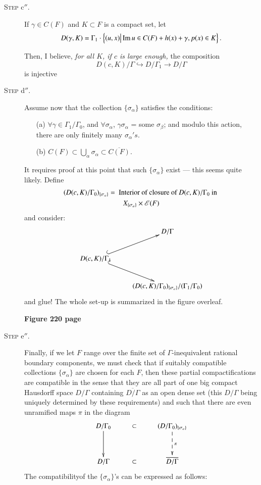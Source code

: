 \begin{description}
\item[\textsc{Step} c$''$.] If $\gamma \in C(F)$ and $K \subset F$ is a compact set, let
$$
D (\gamma, K) = \Gamma_1 \cdot \left\{ (u, x) \big| \operatorname{Im}  u \in C (F) + h(x) + \gamma, p(x) \in K\right\}.
$$

Then, I believe, \textit{ for all $K$, if $c$ is large enough, } the composition
$$
D(c,K) / \Gamma \hookrightarrow D / \Gamma_1 \to D / \Gamma
$$ 
is injective

\item[\textsc{Step} d$''$.] Assume now that the collection $\{\sigma_\alpha\}$ satisfies the conditions:
\begin{itemize}
\item[(a)] $\forall \gamma \in \Gamma_1 / \Gamma_0$, and $\forall \sigma_\alpha$, $\gamma \sigma_\alpha$ = some $\sigma_\beta$; and modulo this action, there are only finitely many $\sigma_\alpha's$.

\item[(b)] $C(F) \subset \bigcup\limits_\alpha \sigma_\alpha \subset \overline{C(F)}$.
\end{itemize}

It requires proof at this point that such $\{\sigma_\alpha\}$ exist --- this seems quite likely. Define
\begin{gather*}
(D(c, K)/\Gamma_0)_{\{\sigma_\alpha\}} = \text{ Interior of closure of } D (c, K)/ \Gamma_0 \text{ in }\\
X_{\{\sigma_\alpha\}} \times \mathscr{E} (F)
\end{gather*}
and consider:
$$
\xymatrix{
& D/\Gamma\\
D(c, K)/\Gamma_1 \ar@{^{(}->}[ur] \ar@{^{(}->}[dr] & \\
& (D(c,K)/\Gamma_0)_{\{\sigma_\alpha\}} / (\Gamma_1/ \Gamma_0)
}
$$
and glue! The whole set-up is summarized in the figure overleaf.
\begin{center}
{\bf Figure 220 page}
\end{center}

\pageoriginale
\item[\textsc{Step} e$''$.] Finally, if we let $F$ range over the finite set of $\Gamma$-inequivalent rational boundary components, we must check that if suitably compatible collections $\{\sigma_\alpha\}$ are chosen for each $F$, then these partial compactifications are compatible in the sense that they are all part of one big compact Hausdorff space $D/\Gamma$ containing $\overline{D/\Gamma}$ as an open dense set (this $D/ \Gamma$ being uniquely determined by these requirements) and such that there are even unramified maps $\pi$ in the diagram
$$
\xymatrix@R=1.2cm{
D/\Gamma_0 \ar[d]& \subset & (D/\Gamma_0)_{\{\sigma_\alpha\}} \ar@{-->}[d]^\pi\\
D/\Gamma & \subset & \overline{D/ \Gamma}
}
$$
The compatibility\pageoriginale of the $\{\sigma_\alpha\}$'s can be expressed as follows:


\end{description}
